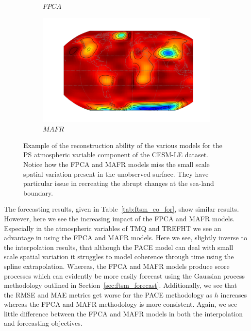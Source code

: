 \begin{figure}
\begin{subfigure}[b]{0.45\textwidth}
 		\caption{$FPCA$}
 		\label{fig:ftsm_res_ps_fpca}
 	\end{subfigure}
 	\begin{subfigure}[b]{0.45\textwidth}
 		\includegraphics[width=\textwidth]{ftsm_res_ps_example_mafr}
 		\caption{$MAFR$}
 		\label{fig:ftsm_res_ps_mafr}
 	\end{subfigure}  
 	\caption[Example of the reconstruction ability of the various models for the PS atmospheric variable component of the CESM-LE dataset.]{Example of the reconstruction ability of the various models for the PS atmospheric variable component of the CESM-LE dataset. Notice how the FPCA and MAFR models miss the small scale spatial variation present in the unobserved surface. They have particular issue in recreating the abrupt changes at the sea-land boundary.}
 	\label{fig:ftsm_res_ps}
 \end{figure}

The forecasting results, given in Table~\ref{tab:ftsm_eo_for}, show similar results.
However, here we see the increasing impact of the FPCA and MAFR models. 
Especially in the atmospheric variables of TMQ and TREFHT we see an advantage in using the FPCA and MAFR models.
Here we see, slightly inverse to the interpolation results, that although the PACE model can deal with small scale spatial variation it struggles to model coherence through time using the spline extrapolation.
Whereas, the FPCA and MAFR models produce score processes which can evidently be more easily forecast using the Gaussian process methodology outlined in Section~\ref{sec:ftsm_forecast}.
Additionally, we see that the RMSE and MAE metrics get worse for the PACE methodology as $h$ increases whereas the FPCA and MAFR methodology is more consistent.
Again, we see little difference between the FPCA and MAFR models in both the interpolation and forecasting objectives. 

